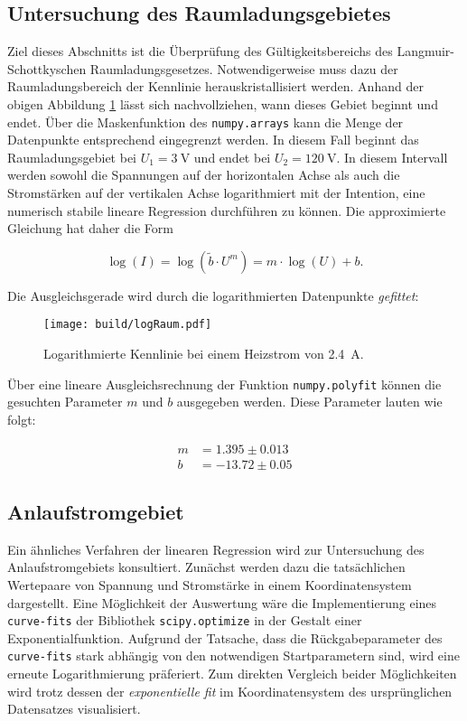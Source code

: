 \subsection{Untersuchung des Raumladungsgebietes}
\label{sec:Raumladungsgebiet}

Ziel dieses Abschnitts ist die Überprüfung des Gültigkeitsbereichs des Langmuir-Schottkyschen Raumladungsgesetzes. Notwendigerweise muss dazu der Raumladungsbereich 
der Kennlinie herauskristallisiert werden. Anhand der obigen Abbildung \ref{fig:Kennlinien2} lässt sich nachvollziehen, wann dieses Gebiet beginnt und endet. Über die 
Maskenfunktion des \texttt{numpy.arrays} kann die Menge der Datenpunkte entsprechend eingegrenzt werden. In diesem Fall beginnt das Raumladungsgebiet bei $U_1 = \qty{3}{\volt}$
und endet bei $U_2 = \qty{120}{\volt}$. In diesem Intervall werden sowohl die Spannungen auf der horizontalen Achse als auch die Stromstärken auf der vertikalen Achse 
logarithmiert mit der Intention, eine numerisch stabile lineare Regression durchführen zu können. Die approximierte Gleichung hat daher die Form

\begin{equation*}
    \log(I) = \log(\tilde{b}\cdot{}U^m) = m\cdot\log(U) + b.
\end{equation*}

\noindent Die Ausgleichsgerade wird durch die logarithmierten Datenpunkte \emph{gefittet}: 

\begin{figure}[H]
    \centering 
    \texttt{[image: build/logRaum.pdf]}
    \caption{Logarithmierte Kennlinie bei einem Heizstrom von \qty{2.4}{\ampere}.}
    \label{fig:Kennlinien2}
\end{figure}

\noindent Über eine lineare Ausgleichsrechnung der Funktion \texttt{numpy.polyfit} können die gesuchten Parameter $m$ und $b$ ausgegeben werden.
Diese Parameter lauten wie folgt:

\begin{align*}
    m &= 1.395\pm0.013\\
    b &= -13.72\pm0.05
\end{align*}

\subsection{Anlaufstromgebiet}
\label{sec:AnlaufstromgebietSec}


Ein ähnliches Verfahren der linearen Regression wird zur Untersuchung des Anlaufstromgebiets konsultiert. Zunächst werden dazu die tatsächlichen Wertepaare von 
Spannung und Stromstärke in einem Koordinatensystem dargestellt. Eine Möglichkeit der Auswertung wäre die Implementierung eines \texttt{curve-fits} der 
Bibliothek \texttt{scipy.optimize} in der Gestalt einer Exponentialfunktion. Aufgrund der Tatsache, dass die Rückgabeparameter des \texttt{curve-fits} stark 
abhängig von den notwendigen Startparametern sind, wird eine erneute Logarithmierung präferiert. Zum direkten Vergleich beider Möglichkeiten wird trotz dessen 
der \emph{exponentielle fit} im Koordinatensystem des ursprünglichen Datensatzes visualisiert.

